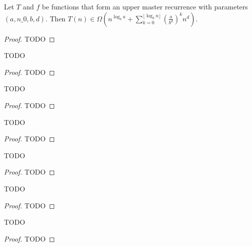 \begin{lemma}
    \label{lemma:big_omega_geom}
    \leanok
    Let $T$ and $f$ be functions that form an upper master recurrence with 
    parameters $(a, n\_0, b, d)$. Then 
    $T(n) \in \Omega(n^{\log_b{a}} + \sum_{k=0}^{\lfloor \log_b{n} \rfloor} (\frac{a}{b^d})^k n^d)$.
\end{lemma}

\begin{proof}
    \notready
    TODO
\end{proof}

\begin{theorem}
    \label{thm:upper_master_rec_big_omega}
    \notready
    TODO
\end{theorem}

\begin{proof}
    \notready
    TODO
\end{proof}

\begin{theorem}
    \label{thm:upper_master_rec_big_omega_of_eq}
    \notready
    TODO
\end{theorem}

\begin{proof}
    \notready
    TODO
\end{proof}

\begin{theorem}
    \label{thm:upper_master_rec_big_omega_of_gt}
    \notready
    TODO
\end{theorem}

\begin{proof}
    \notready
    TODO
\end{proof}


\begin{corollary}
    \label{thm:master_rec_theta_of_lt}
    \notready
    TODO
\end{corollary}

\begin{proof}
    \notready
    TODO
\end{proof}

\begin{corollary}
    \label{thm:master_rec_theta_of_eq}
    \notready
    TODO
\end{corollary}

\begin{proof}
    \notready
    TODO
\end{proof}

\begin{corollary}
    \label{thm:master_rec_theta_of_gt}
    \notready
    TODO
\end{corollary}

\begin{proof}
    \notready
    TODO
\end{proof}
